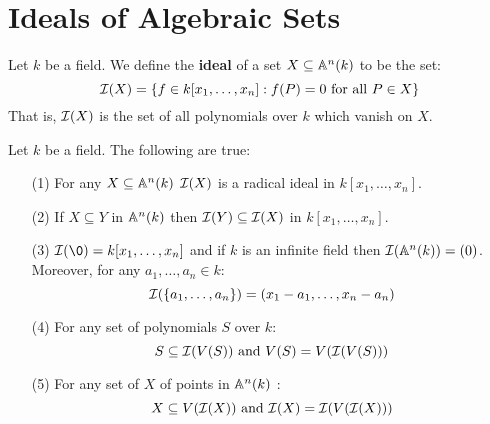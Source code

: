 \section{Ideals of Algebraic Sets}\label{section_10.2}

\begin{definition}
  Let $k$ be a field. We define the  \textbf{ideal} of a set $X
  \subseteq \mathbb{A}^n(k)$ to be the set:
  \begin{equation*}
    \mathcal{I}(X)=\{ f \in k[x_1, \dots, x_n] : f(P)=0 \text{ for all } P \in X \}
  \end{equation*}
  That is, $\mathcal{I}(X)$ is the set of all polynomials over $k$ which
  vanish on $X$.
\end{definition}

\begin{proposition}\label{proposition_10.2.1}
  Let $k$ be a field. The following are true:
  \begin{enumerate}
    \item[(1)] For any $X \subseteq \mathbb{A}^n(k)$ $\mathcal{I}(X)$ is a radical
      ideal in $k[x_1, \dots, x_n]$.

    \item[(2)] If $X \subseteq Y$ in $\mathbb{A}^n(k)$ then $\mathcal{I}(Y) \subseteq
      \mathcal{I}(X)$ in $k[x_1, \dots, x_n]$.

    \item[(3)] $\Ic(\0)=k[x_1, \dots, x_n]$ and if $k$ is an infinite
      field then $\mathcal{I}(\mathbb{A}^n(k))=(0)$. Moreover, for any $a_1, \dots,
      a_n \in k$:
      \begin{equation*}
        \mathcal{I}(\{a_1, \dots, a_n\})=(x_1-a_1, \dots, x_n-a_n)
      \end{equation*}

    \item[(4)] For any set of polynomials $S$ over $k$:
      \begin{equation*}
        S \subseteq \mathcal{I}(V(S)) \text{ and } V(S)=V(\mathcal{I}(V(S)))
      \end{equation*}

    \item[(5)] For any set of $X$ of points in $\mathbb{A}^n(k)$ :
      \begin{equation*}
        X \subseteq V(\mathcal{I}(X)) \text{ and } \mathcal{I}(X)=\mathcal{I}(V(\mathcal{I}(X)))
      \end{equation*}
  \end{enumerate}
\end{proposition}
